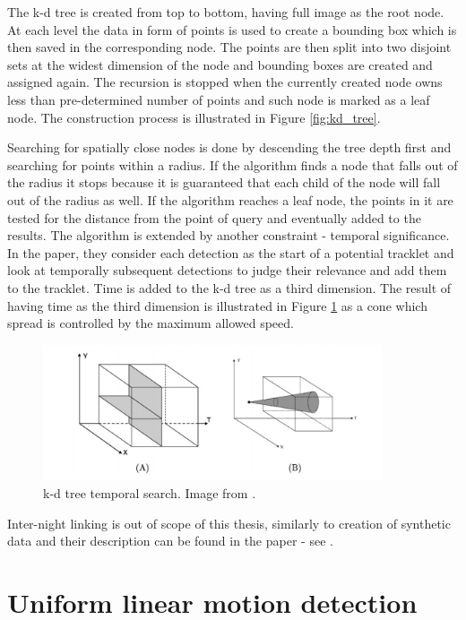 	The k-d tree is created from top to bottom, having full image as the root node. At each level the data in form of points is used to create a bounding box which is then saved in the corresponding node. The points are then split into two disjoint sets at the widest dimension of the node and bounding boxes are created and assigned again. The recursion is stopped when the currently created node owns less than pre-determined number of points and such node is marked as a leaf node. The construction process is illustrated in Figure \ref{fig:kd_tree}.
	
	Searching for spatially close nodes is done by descending the tree depth first and searching for points within a radius. If the algorithm finds a node that falls out of the radius it stops because it is guaranteed that each child of the node will fall out of the radius as well. If the algorithm reaches a leaf node, the points in it are tested for the distance from the point of query and eventually added to the results. The algorithm is extended by another constraint - temporal significance. In the paper, they consider each detection as the start of a potential tracklet and look at temporally subsequent detections to judge their relevance and add them to the tracklet. Time is added to the k-d tree as a third dimension. The result of having time as the third dimension is illustrated in Figure \ref{fig:kd_tree_time} as a cone which spread is controlled by the maximum allowed speed.
	
	\begin{figure}[H]
	\centering
	  \includegraphics[width=10cm]{images/kd_tree_time}
		  \caption{k-d tree temporal search. Image from \citep{kubica}.}
	  \label{fig:kd_tree_time}
	\end{figure}
	
	Inter-night linking is out of scope of this thesis, similarly to creation of synthetic data and their description can be found in the paper - see \citep{kubica}.

\section{Uniform linear motion detection}\label{sec:linear_motion}
	
